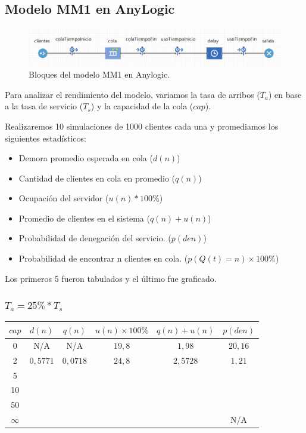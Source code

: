 \subsection{Modelo MM1 en AnyLogic}

\begin{figure}[H]
  \includegraphics[width=\linewidth]{images/anylogic-colas-modelo}
  \caption{Bloques del modelo MM1 en Anylogic.}
\end{figure}

Para analizar el rendimiento del modelo, variamos la tasa de arribos ($T_a$) en base a la tasa de servicio ($T_s$) y
la capacidad de la cola ($cap$).

Realizaremos 10 simulaciones de 1000 clientes cada una y promediamos los siguientes estadísticos:
\begin{itemize}
    \item Demora promedio esperada en cola ($d(n)$)
    \item Cantidad de clientes en cola en promedio ($q(n)$)
    \item Ocupación del servidor ($u(n)*100\%$)
    \item Promedio de clientes en el sistema ($q(n)+u(n)$)
    \item Probabilidad de denegación del servicio. ($p(den)$)
    \item Probabilidad de encontrar n clientes en cola. ($p(Q(t)=n)\times100\%$)
\end{itemize}

Los primeros 5 fueron tabulados y el último fue graficado.

\subsubsection{$T_a = 25\% * T_s$}

\begin{tabular}{||c|c|c|c|c|c||}
    \hline \hline
    $cap$ & $d(n)$ & $q(n)$ & $u(n)\times100\%$ & $q(n)+u(n)$ & $p(den)$ \\
    \hline \hline
    0 & N/A & N/A & $19,8$ & $1,98$ & $20,16$ \\
    \hline
    2 & $0,5771$ & $0,0718$ & $24,8$ & $2,5728$ & $1,21$ \\
    \hline
    5 &  &  &  &  &  \\
    \hline
    10 &  &  &  &  &  \\
    \hline
    50 &  &  &  &  &  \\
    \hline
    $\infty$ &  &  &  &  & N/A \\
    \hline \hline
\end{tabular}
